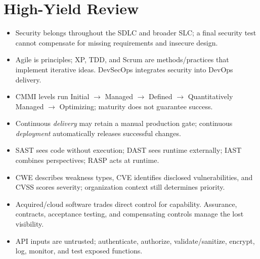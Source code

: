 \documentclass[10pt,letterpaper]{article}
\begin{document}
\section{\color{navy}High-Yield Review}
\begin{itemize}
\item Security belongs throughout the SDLC and broader SLC; a final security test cannot compensate for missing requirements and insecure design.
\item Agile is principles; XP, TDD, and Scrum are methods/practices that implement iterative ideas. DevSecOps integrates security into DevOps delivery.
\item CMMI levels run Initial $\rightarrow$ Managed $\rightarrow$ Defined $\rightarrow$ Quantitatively Managed $\rightarrow$ Optimizing; maturity does not guarantee success.
\item Continuous \emph{delivery} may retain a manual production gate; continuous \emph{deployment} automatically releases successful changes.
\item SAST sees code without execution; DAST sees runtime externally; IAST combines perspectives; RASP acts at runtime.
\item CWE describes weakness types, CVE identifies disclosed vulnerabilities, and CVSS scores severity; organization context still determines priority.
\item Acquired/cloud software trades direct control for capability. Assurance, contracts, acceptance testing, and compensating controls manage the lost visibility.
\item API inputs are untrusted; authenticate, authorize, validate/sanitize, encrypt, log, monitor, and test exposed functions.
\end{itemize}
\end{document}
